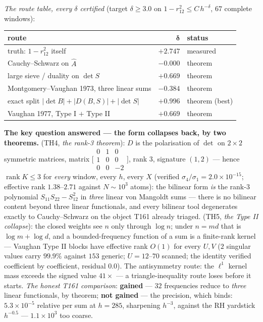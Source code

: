 \documentclass[11pt,a4paper]{article}
\begin{document}
\emph{The route table, every $\delta$ certified} (target $\delta\ge3.0$ on
$1-r_{12}^2\le C\,h^{-\delta}$, $67$ complete windows):
\begin{center}\small
\begin{tabular}{@{}l r l@{}}
\toprule
\textbf{route} & $\boldsymbol{\delta}$ & \textbf{status}\\
\midrule
truth: $1-r_{12}^2$ itself & $+2.747$ & measured\\
Cauchy--Schwarz on $\hat A$ & $-0.000$ & theorem\\
large sieve / duality on $\det S$ & $+0.669$ & theorem\\
Montgomery--Vaughan 1973, three linear sums & $-0.384$ & theorem\\
exact split $|\det B|+|D(B,S)|+|\det S|$ & $+0.996$ & theorem (best)\\
Vaughan 1977, Type I $+$ Type II & $+0.669$ & theorem\\
\bottomrule
\end{tabular}
\end{center}
\noindent \textbf{The key question answered --- the form collapses back, by
two theorems.} (TH4, \emph{the rank-3 theorem}): $D$ is the polarisation of
$\det$ on $2\times2$ symmetric matrices, matrix
$\bigl[\begin{smallmatrix}0&1&0\\1&0&0\\0&0&-2\end{smallmatrix}\bigr]$, rank
$3$, signature $(1,2)$ --- hence $\operatorname{rank}K\le3$ for \emph{every}
window, every $h$, every $X$ (verified $\sigma_4/\sigma_1=2.0\times10^{-15}$;
effective rank $1.38$--$2.71$ against $N\sim10^3$ atoms): the bilinear form
\emph{is} the rank-3 polynomial $S_{11}S_{22}-S_{12}^2$ in \emph{three}
linear von Mangoldt sums --- there is no bilinear content beyond three
linear functionals, and every bilinear tool degenerates exactly to
Cauchy--Schwarz on the object T161 already triaged. (TH5, \emph{the Type II
collapse}): the closed weights see $n$ only through $\log n$; under $n=md$
that is $\log m+\log d$, and a bounded-frequency function of a sum is a
finite-rank kernel --- Vaughan Type II blocks have effective rank $O(1)$ for
every $U,V$ ($2$ singular values carry $99.9\%$ against $153$ generic;
$U=12$--$70$ scanned; the identity verified coefficient by coefficient,
residual $0.0$). The antisymmetry route: the $\ell^1$ kernel mass exceeds
the signed value $41\times$ --- a triangle-inequality route loses before it
starts. \emph{The honest T161 comparison}: \textbf{gained} --- $32$
frequencies reduce to \emph{three} linear functionals, by theorem;
\textbf{not gained} --- the precision, which binds: $5.3\times10^{-5}$
relative per sum at $h=285$, sharpening $h^{-3}$, against the RH yardstick
$h^{-0.5}$ --- $1.1\times10^{3}$ too coarse.
\end{document}
